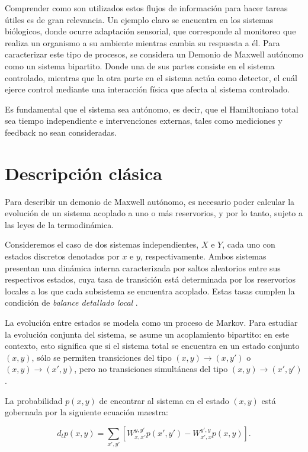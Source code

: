 Comprender como son utilizados estos flujos de información para hacer tareas útiles es de gran relevancia. Un ejemplo claro se encuentra en los sistemas biólogicos, donde ocurre adaptación sensorial, que corresponde al monitoreo que realiza un organismo a su ambiente mientras cambia su respuesta a él\cite{lan2012energy}. Para caracterizar este tipo de procesos, se considera un Demonio de Maxwell autónomo como un sistema bipartito. Donde una de sus partes consiste en el sistema controlado, mientras que la otra parte en el sistema actúa como detector, el cuál ejerce control mediante una interacción física que afecta al sistema controlado.

Es fundamental que el sistema sea autónomo, es decir, que el Hamiltoniano total sea tiempo independiente e intervenciones externas, tales como mediciones y feedback no sean consideradas.

\label{sec4:autonomo}
\section{Descripción clásica}
Para describir un demonio de Maxwell autónomo, es necesario poder calcular la evolución de un sistema acoplado a uno o más reservorios, y por lo tanto, sujeto a las leyes de la termodinámica. 

Consideremos el caso de dos sistemas independientes, \( X \) e \( Y \), cada uno con estados discretos denotados por \( x \) e \( y \), respectivamente. Ambos sistemas presentan una dinámica interna caracterizada por saltos aleatorios entre sus respectivos estados, cuya tasa de transición está determinada por los reservorios locales a los que cada subsistema se encuentra acoplado. Estas tasas cumplen la condición de \textit{balance detallado local} \cite{van2015ensemble}.

La evolución entre estados se modela como un proceso de Markov\cite{van1992stochastic}. Para estudiar la evolución conjunta del sistema, se asume un acoplamiento bipartito: en este contexto, esto significa que si el sistema total se encuentra en un estado conjunto $(x,y)$, sólo se permiten transiciones del tipo $(x,y) \to (x,y')$ o $(x,y) \to (x',y)$, pero no transiciones simultáneas del tipo $(x,y) \to (x',y')$.

La probabilidad \( p(x,y) \) de encontrar al sistema en el estado \( (x,y) \) está gobernada por la siguiente ecuación maestra:

\begin{equation*}
    d_{t}p(x,y) = \sum_{x',y'} \left[ W_{x,x'}^{y,y'}p(x',y')  - W_{x',x}^{y',y}p(x,y) \right].
\end{equation*}

